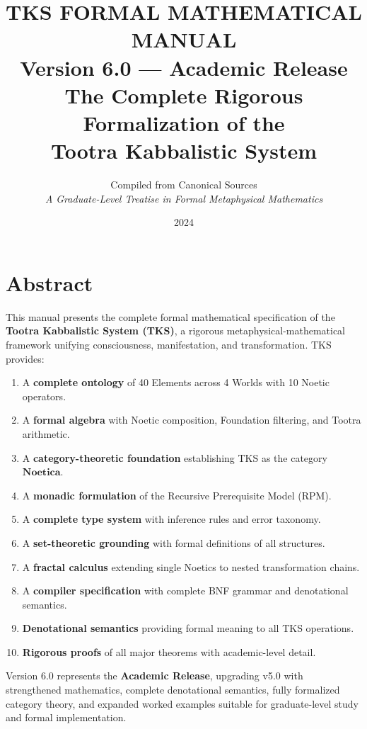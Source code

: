 \documentclass[11pt,twoside,openright]{book}
\title{%
  \Huge\bfseries TKS FORMAL MATHEMATICAL MANUAL\\[0.5em]
  \Large Version 6.0 — Academic Release\\[1em]
  \large The Complete Rigorous Formalization of the\\
  Tootra Kabbalistic System
}
\author{%
  Compiled from Canonical Sources\\[0.5em]
  \textit{A Graduate-Level Treatise in Formal Metaphysical Mathematics}
}
\date{2024}
\theoremstyle{definition}
\theoremstyle{plain}
\theoremstyle{remark}
\newcommand{\Noetica}{\mathbf{Noetica}}
\begin{document}
\frontmatter
\maketitle

\chapter*{Abstract}

This manual presents the complete formal mathematical specification of the \textbf{Tootra Kabbalistic System (TKS)}, a rigorous metaphysical-mathematical framework unifying consciousness, manifestation, and transformation. TKS provides:

\begin{enumerate}[label=(\arabic*)]
  \item A \textbf{complete ontology} of 40 Elements across 4 Worlds with 10 Noetic operators.
  \item A \textbf{formal algebra} with Noetic composition, Foundation filtering, and Tootra arithmetic.
  \item A \textbf{category-theoretic foundation} establishing TKS as the category $\Noetica$.
  \item A \textbf{monadic formulation} of the Recursive Prerequisite Model (RPM).
  \item A \textbf{complete type system} with inference rules and error taxonomy.
  \item A \textbf{set-theoretic grounding} with formal definitions of all structures.
  \item A \textbf{fractal calculus} extending single Noetics to nested transformation chains.
  \item A \textbf{compiler specification} with complete BNF grammar and denotational semantics.
  \item \textbf{Denotational semantics} providing formal meaning to all TKS operations.
  \item \textbf{Rigorous proofs} of all major theorems with academic-level detail.
\end{enumerate}

Version 6.0 represents the \textbf{Academic Release}, upgrading v5.0 with strengthened mathematics, complete denotational semantics, fully formalized category theory, and expanded worked examples suitable for graduate-level study and formal implementation.
\end{document}
